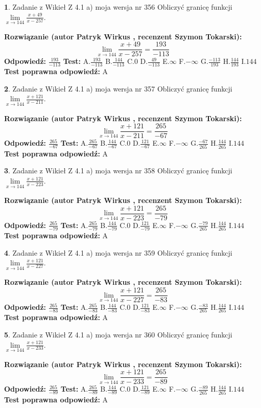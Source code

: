 \documentclass[12pt, a4paper]{article}
\theoremstyle{definition} %
\newtheorem{zad}{}
\newcommand{\zadStart}[1]{\begin{zad}#1\newline}
\newcommand{\zadStop}{\end{zad}}
\newcommand{\rozwStart}[2]{\noindent \textbf{Rozwiązanie (autor #1 , recenzent #2): }\newline}
\newcommand{\rozwStop}{\newline}
\newcommand{\odpStart}{\noindent \textbf{Odpowiedź:}\newline}
\newcommand{\odpStop}{\newline}
\newcommand{\testStart}{\noindent \textbf{Test:}\newline}
\newcommand{\testStop}{\newline}
\newcommand{\kluczStart}{\noindent \textbf{Test poprawna odpowiedź:}\newline}
\newcommand{\kluczStop}{\newline}
\begin{document}
\zadStart{Zadanie z Wikieł Z 4.1 a) moja wersja nr 356}
Obliczyć granicę funkcji $\lim\limits_{x\to144}\frac{x+49}{x-257}$.
\zadStop
\rozwStart{Patryk Wirkus}{Szymon Tokarski}
$$\lim\limits_{x\to144}\frac{x+49}{x-257} = \frac{193}{-113}$$
\rozwStop
\odpStart
$\frac{193}{-113}$
\odpStop
\testStart
A.$\frac{193}{-113}$
B.$\frac{144}{-113}$
C.$0$
D.$\frac{49}{-113}$
E.$\infty$
F.$-\infty$
G.$\frac{-113}{193}$
H.$\frac{144}{193}$
I.$144$
\testStop
\kluczStart
A
\kluczStop



\zadStart{Zadanie z Wikieł Z 4.1 a) moja wersja nr 357}
Obliczyć granicę funkcji $\lim\limits_{x\to144}\frac{x+121}{x-211}$.
\zadStop
\rozwStart{Patryk Wirkus}{Szymon Tokarski}
$$\lim\limits_{x\to144}\frac{x+121}{x-211} = \frac{265}{-67}$$
\rozwStop
\odpStart
$\frac{265}{-67}$
\odpStop
\testStart
A.$\frac{265}{-67}$
B.$\frac{144}{-67}$
C.$0$
D.$\frac{121}{-67}$
E.$\infty$
F.$-\infty$
G.$\frac{-67}{265}$
H.$\frac{144}{265}$
I.$144$
\testStop
\kluczStart
A
\kluczStop



\zadStart{Zadanie z Wikieł Z 4.1 a) moja wersja nr 358}
Obliczyć granicę funkcji $\lim\limits_{x\to144}\frac{x+121}{x-223}$.
\zadStop
\rozwStart{Patryk Wirkus}{Szymon Tokarski}
$$\lim\limits_{x\to144}\frac{x+121}{x-223} = \frac{265}{-79}$$
\rozwStop
\odpStart
$\frac{265}{-79}$
\odpStop
\testStart
A.$\frac{265}{-79}$
B.$\frac{144}{-79}$
C.$0$
D.$\frac{121}{-79}$
E.$\infty$
F.$-\infty$
G.$\frac{-79}{265}$
H.$\frac{144}{265}$
I.$144$
\testStop
\kluczStart
A
\kluczStop



\zadStart{Zadanie z Wikieł Z 4.1 a) moja wersja nr 359}
Obliczyć granicę funkcji $\lim\limits_{x\to144}\frac{x+121}{x-227}$.
\zadStop
\rozwStart{Patryk Wirkus}{Szymon Tokarski}
$$\lim\limits_{x\to144}\frac{x+121}{x-227} = \frac{265}{-83}$$
\rozwStop
\odpStart
$\frac{265}{-83}$
\odpStop
\testStart
A.$\frac{265}{-83}$
B.$\frac{144}{-83}$
C.$0$
D.$\frac{121}{-83}$
E.$\infty$
F.$-\infty$
G.$\frac{-83}{265}$
H.$\frac{144}{265}$
I.$144$
\testStop
\kluczStart
A
\kluczStop



\zadStart{Zadanie z Wikieł Z 4.1 a) moja wersja nr 360}
Obliczyć granicę funkcji $\lim\limits_{x\to144}\frac{x+121}{x-233}$.
\zadStop
\rozwStart{Patryk Wirkus}{Szymon Tokarski}
$$\lim\limits_{x\to144}\frac{x+121}{x-233} = \frac{265}{-89}$$
\rozwStop
\odpStart
$\frac{265}{-89}$
\odpStop
\testStart
A.$\frac{265}{-89}$
B.$\frac{144}{-89}$
C.$0$
D.$\frac{121}{-89}$
E.$\infty$
F.$-\infty$
G.$\frac{-89}{265}$
H.$\frac{144}{265}$
I.$144$
\testStop
\kluczStart
A
\kluczStop
\end{document}
